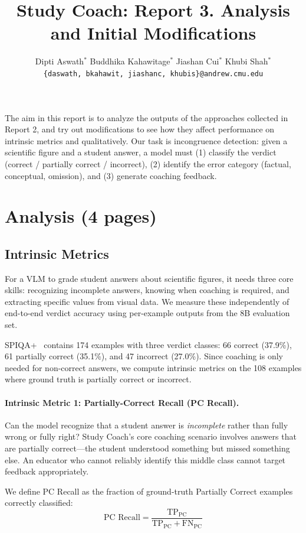 \documentclass{article}
\title{Study Coach: Report 3. Analysis and Initial Modifications}
\author{
  Dipti Aswath$^*$ \hspace{2em} Buddhika Kahawitage$^*$ \hspace{2em} Jiashan Cui$^*$ \hspace{2em} Khubi Shah$^*$ \\
  \texttt{\{daswath, bkahawit, jiashanc, khubis\}@andrew.cmu.edu}
}
\date{}
\begin{document}
\maketitle

The aim in this report is to analyze the outputs of the approaches collected in Report 2,
and try out modifications to see how they affect performance on intrinsic metrics
and qualitatively. Our task is incongruence detection: given a scientific figure and
a student answer, a model must (1) classify the verdict (correct / partially correct
/ incorrect), (2) identify the error category (factual, conceptual, omission), and
(3) generate coaching feedback.

\section{Analysis (4 pages)}

\subsection{ Intrinsic Metrics}

For a VLM to grade student answers about scientific figures, it needs three core
skills: recognizing incomplete answers, knowing when coaching is required, and
extracting specific values from visual data. We measure these independently of
end-to-end verdict accuracy using per-example outputs from the 8B evaluation set.

SPIQA+~\cite{pramanick2024spiqa} contains 174 examples with three verdict classes: 66 correct (37.9\%),
61 partially correct (35.1\%), and 47 incorrect (27.0\%). Since coaching is only
needed for non-correct answers, we compute intrinsic metrics on the 108 examples
where ground truth is partially correct or incorrect.

\paragraph{Intrinsic Metric 1: Partially-Correct Recall (PC Recall).}

Can the model recognize that a student answer is \textit{incomplete} rather than
fully wrong or fully right? Study Coach's core coaching scenario involves answers
that are partially correct---the student understood something but missed something
else. An educator who cannot reliably identify this middle class cannot target
feedback appropriately.

We define PC Recall as the fraction of ground-truth Partially Correct examples
correctly classified:
\begin{equation}
\text{PC Recall} = \frac{\text{TP}_\text{PC}}{\text{TP}_\text{PC} + \text{FN}_\text{PC}}
\end{equation}
\end{document}
